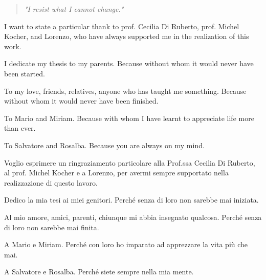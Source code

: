  \begin{quote}
	\vspace*{3cm}
	\begin{flushright}

			\textit{"I resist what I cannot change."} \\[\baselineskip]
		
	\end{flushright}
\end{quote}



\vspace*{4.5cm}

\noindent
I want to state a particular thank to prof. Cecilia Di Ruberto, prof. Michel Kocher, and Lorenzo, who have always supported me in the realization of this work.

\noindent
I dedicate my thesis to my parents. Because without whom it would never have been started. 

\noindent
To my love, friends, relatives, anyone who has taught me something. Because without whom it would never have been finished.

\noindent
To Mario and Miriam. Because with whom I have learnt to appreciate life more than ever.

\noindent
To Salvatore and Rosalba. Because you are always on my mind. 

\vspace{5mm} 

\noindent
Voglio esprimere un ringraziamento particolare alla Prof.ssa Cecilia Di Ruberto, al prof. Michel Kocher e a Lorenzo, per avermi sempre supportato nella realizzazione di questo lavoro.

\noindent
Dedico la mia tesi ai miei genitori. Perch\'{e} senza di loro non sarebbe mai iniziata.

\noindent
Al mio amore, amici, parenti, chiunque mi abbia insegnato qualcosa. Perch\'{e} senza di loro non sarebbe mai finita.

\noindent
A Mario e Miriam. Perch\'{e} con loro ho imparato ad apprezzare la vita pi\`{u} che mai.

\noindent
A Salvatore e Rosalba. Perch\'{e} siete sempre nella mia mente.